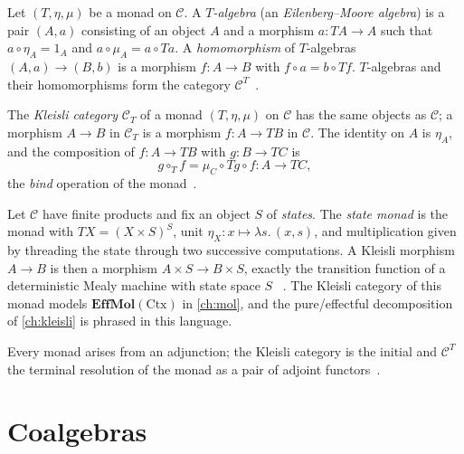 \begin{definition}
Let $(T, \eta, \mu)$ be a monad on $\mathcal{C}$. A \emph{$T$-algebra}
(an \emph{Eilenberg--Moore algebra}) is a pair $(A, a)$ consisting of an
object $A$ and a morphism $a \colon T A \to A$ such that
$a \circ \eta_A = 1_A$ and $a \circ \mu_A = a \circ T a$. A \emph{homomorphism}
of $T$-algebras $(A,a) \to (B,b)$ is a morphism $f \colon A \to B$ with
$f \circ a = b \circ T f$. $T$-algebras and their homomorphisms form the
category $\mathcal{C}^T$~\cite{maclane}.
\end{definition}

\begin{definition}
The \emph{Kleisli category} $\mathcal{C}_T$ of a monad $(T, \eta, \mu)$ on
$\mathcal{C}$ has the same objects as $\mathcal{C}$; a morphism $A \to B$ in
$\mathcal{C}_T$ is a morphism $f \colon A \to T B$ in $\mathcal{C}$. The
identity on $A$ is $\eta_A$, and the composition of $f \colon A \to T B$ with
$g \colon B \to T C$ is
\[ g \circ_T f = \mu_C \circ T g \circ f \colon A \to T C, \]
the \emph{bind} operation of the monad~\cite{maclane, arxiv-monads-kleisli}.
\end{definition}

\begin{example}
Let $\mathcal{C}$ have finite products and fix an object $S$ of
\emph{states}. The \emph{state monad} is the monad with
$T X = (X \times S)^S$, unit $\eta_X \colon x \mapsto \lambda s.\,(x, s)$,
and multiplication given by threading the state through two successive
computations. A Kleisli morphism $A \to B$ is then a morphism
$A \times S \to B \times S$, exactly the transition function of a
deterministic Mealy machine with state space $S$
~\cite{maclane, arxiv-monads-kleisli, mealy, moore, arxiv-mealy}. The
Kleisli category of this monad models $\mathbf{EffMol} (\mathrm{Ctx})$ in
\autoref{ch:mol}, and the pure/effectful decomposition of
\autoref{ch:kleisli} is phrased in this language.
\end{example}

\begin{remark}
Every monad arises from an adjunction; the Kleisli category is the initial
and $\mathcal{C}^T$ the terminal resolution of the monad as a pair of
adjoint functors~\cite{maclane, arxiv-monads-kleisli}.
\end{remark}

\section{Coalgebras}\label{sec:prelim-coalg}

